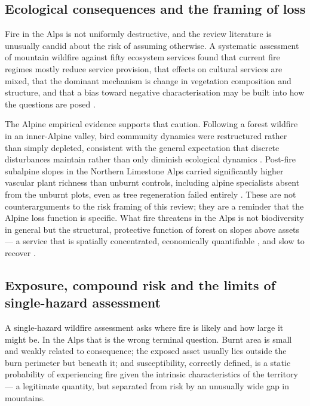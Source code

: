 \documentclass[11pt,a4paper]{article}
\begin{document}
\subsection{Ecological consequences and the framing of loss}

Fire in the Alps is not uniformly destructive, and the review literature is unusually candid about the risk of assuming otherwise. A systematic assessment of mountain wildfire against fifty ecosystem services found that current fire regimes mostly reduce service provision, that effects on cultural services are mixed, that the dominant mechanism is change in vegetation composition and structure, and that a bias toward negative characterisation may be built into how the questions are posed \citep{vukomanovic_systematic_2019}.

The Alpine empirical evidence supports that caution. Following a forest wildfire in an inner-Alpine valley, bird community dynamics were restructured rather than simply depleted, consistent with the general expectation that discrete disturbances maintain rather than only diminish ecological dynamics \citep{rey_effects_2019}. Post-fire subalpine slopes in the Northern Limestone Alps carried significantly higher vascular plant richness than unburnt controls, including alpine specialists absent from the unburnt plots, even as tree regeneration failed entirely \citep{degiuli_arrested_2024}. These are not counterarguments to the risk framing of this review; they are a reminder that the Alpine loss function is specific. What fire threatens in the Alps is not biodiversity in general but the structural, protective function of forest on slopes above assets --- a service that is spatially concentrated, economically quantifiable \citep{moos_climate_2021}, and slow to recover \citep{stritih_alternative_2023, degiuli_arrested_2024}.

\subsection{Exposure, compound risk and the limits of single-hazard assessment}

A single-hazard wildfire assessment asks where fire is likely and how large it might be. In the Alps that is the wrong terminal question. Burnt area is small and weakly related to consequence; the exposed asset usually lies outside the burn perimeter but beneath it; and susceptibility, correctly defined, is a static probability of experiencing fire given the intrinsic characteristics of the territory \citep{trucchia_defining_2022} --- a legitimate quantity, but separated from risk by an unusually wide gap in mountains.
\end{document}
